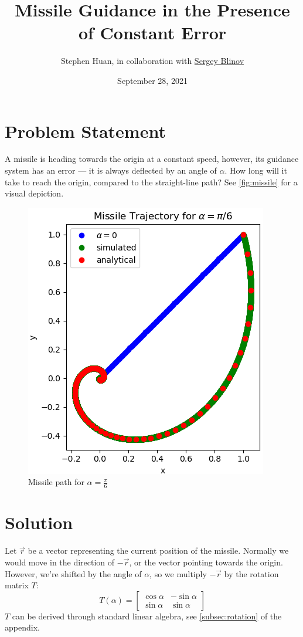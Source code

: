 \documentclass[11pt, oneside]{article}
\title{Missile Guidance in the Presence of Constant Error}
\author{Stephen Huan, in collaboration with
\href{https://github.com/GLaDOS-42}{Sergey Blinov}}
\date{September 28, 2021}
\begin{document}
\maketitle

\section{Problem Statement}

A missile is heading towards the origin at a constant speed, however, its
guidance system has an error --- it is always deflected by an angle of
\( \alpha \). How long will it take to reach the origin, compared to the
straight-line path? See \autoref{fig:missile} for a visual depiction.

\begin{figure}[h!]
  \centering
  \includegraphics[scale=0.95]{missile.png}
  \caption{Missile path for \( \alpha = \frac{\pi}{6} \)}
  \label{fig:missile}
\end{figure}

\section{Solution}

Let \( \vec{r} \) be a vector representing the current position of the
missile. Normally we would move in the direction of \( -\vec{r} \), or the
vector pointing towards the origin. However, we're shifted by the angle of \(
\alpha \), so we multiply \( -\vec{r} \) by the rotation matrix \( T \):
\[ T(\alpha) = \begin{bmatrix} \cos \alpha & -\sin \alpha \\ 
                               \sin \alpha &  \sin \alpha 
                 \end{bmatrix} \]
\( T \) can be derived through standard linear algebra,
see \autoref{subsec:rotation} of the appendix.
\end{document}
